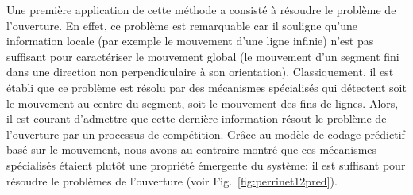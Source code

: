 \documentclass[11pt,french,a4paper,oneside]{article}%
\begin{document}
Une première application de cette méthode a consisté à résoudre le problème de l'ouverture. En effet, ce problème est remarquable car il souligne qu'une information locale (par exemple le mouvement d'une ligne infinie) n'est pas suffisant pour caractériser le mouvement global (le mouvement d'un segment fini dans une direction non perpendiculaire à son orientation). Classiquement, il est établi que ce problème est résolu par des mécanismes spécialisés qui détectent soit le mouvement au centre du segment, soit le mouvement des fins de lignes. Alors, il est courant d'admettre que cette dernière information résout le problème de l'ouverture par un processus de compétition. Grâce au modèle de codage prédictif basé sur le mouvement, nous avons au contraire montré que ces mécanismes spécialisés étaient plutôt une propriété émergente du système: il est suffisant pour résoudre le problèmes de l'ouverture (voir Fig.~\ref{fig:perrinet12pred}).
\end{document}
